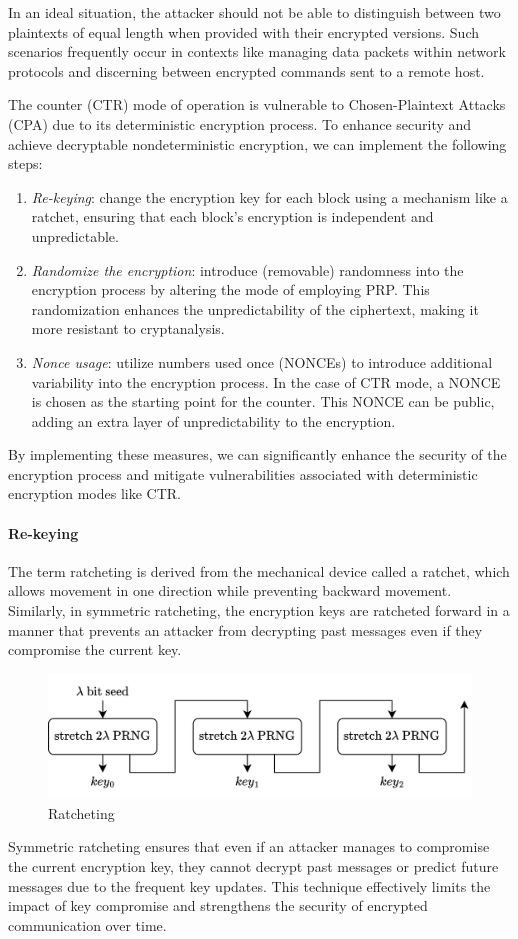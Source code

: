 In an ideal situation, the attacker should not be able to distinguish between two plaintexts of equal length when provided with their encrypted versions.
Such scenarios frequently occur in contexts like managing data packets within network protocols and discerning between encrypted commands sent to a remote host.

The counter (CTR) mode of operation is vulnerable to Chosen-Plaintext Attacks (CPA) due to its deterministic encryption process.
To enhance security and achieve decryptable nondeterministic encryption, we can implement the following steps:
\begin{enumerate}
    \item \textit{Re-keying}: change the encryption key for each block using a mechanism like a ratchet, ensuring that each block's encryption is independent and unpredictable.
    \item \textit{Randomize the encryption}: introduce (removable) randomness into the encryption process by altering the mode of employing PRP. 
        This randomization enhances the unpredictability of the ciphertext, making it more resistant to cryptanalysis.
    \item \textit{Nonce usage}: utilize numbers used once (NONCEs) to introduce additional variability into the encryption process. 
        In the case of CTR mode, a NONCE is chosen as the starting point for the counter. 
        This NONCE can be public, adding an extra layer of unpredictability to the encryption.
\end{enumerate}
By implementing these measures, we can significantly enhance the security of the encryption process and mitigate vulnerabilities associated with deterministic encryption modes like CTR.

\paragraph*{Re-keying}
The term ratcheting is derived from the mechanical device called a ratchet, which allows movement in one direction while preventing backward movement. 
Similarly, in symmetric ratcheting, the encryption keys are ratcheted forward in a manner that prevents an attacker from decrypting past messages even if they compromise the current key.
\begin{figure}[H]
    \centering
    \includegraphics[width=0.75\linewidth]{images/ratchet.png}
    \caption{Ratcheting}
\end{figure}
Symmetric ratcheting ensures that even if an attacker manages to compromise the current encryption key, they cannot decrypt past messages or predict future messages due to the frequent key updates. 
This technique effectively limits the impact of key compromise and strengthens the security of encrypted communication over time.

